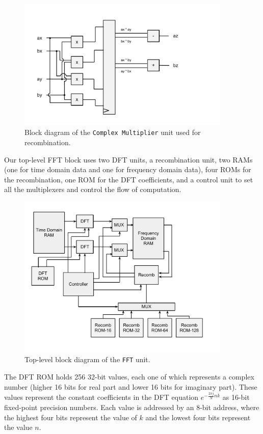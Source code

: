 \documentclass{article}
\begin{document}
\begin{figure}[H]
	\centering
	\includegraphics[width=4in]{complex-mult}
	\caption{Block diagram of the \texttt{Complex Multiplier} unit used for 
	recombination. }
\end{figure}

Our top-level FFT block uses two DFT units, a recombination unit,
two RAMs (one for time domain data and one for frequency domain data),
four ROMs for the recombination, one ROM for the DFT coefficients, and
a control unit to set all the multiplexers and control the flow of
computation.

\begin{figure}[H]
	\centering
	\includegraphics[width=4in]{fft-top}
	\caption{Top-level block diagram of the \texttt{FFT} unit.}
\end{figure}

The DFT ROM holds 256 32-bit values, each one of which represents a
complex number (higher 16 bits for real part and lower 16 bits for
imaginary part). These values represent the constant coefficients
in the DFT equation \(e^{-\frac{2\pi j}{N} n k}\) as 16-bit fixed-point
precision numbers. Each value is addressed by an 8-bit address, where
the highest four bits represent the value of \(k\) and the lowest four bits
represent the value \(n\).
\end{document}
